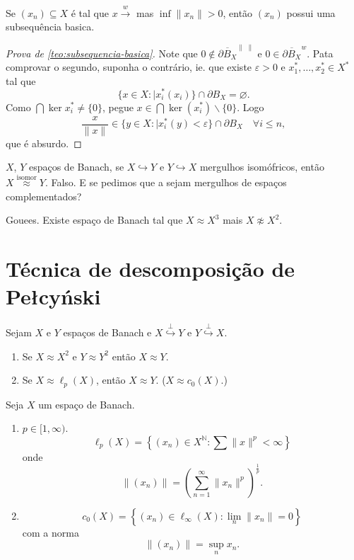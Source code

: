 \documentclass[portuguese]{article}
\theoremstyle{definition}
\newcommand{\N}{\mathbb{N}}
\begin{document}
\begin{coro}
	Se $(x_n)\subseteq X$ é tal que $x\overset{w}{\longrightarrow}$ mas $\inf\|x_n\|>0$, então $(x_n)$ possui uma subsequência basica.
\end{coro}
\begin{proof}[Prova de \cref{teo:subsequencia-basica}]
	Note que $0\notin \overline{\partial B_X}^{\|\;\|}$ e $0\in\overline{\partial B_X}^w$. Pata comprovar o segundo, suponha o contrário, ie. que existe $\varepsilon>0$ e $x_1^*,\ldots,x_2^*\in X^*$ tal que
	\[\{x\in X:|x^*_i(x_i)\}\cap\partial B_X=\varnothing.\]
	Como $\bigcap \ker x^*_i\neq\{0\}$, pegue $x\in \bigcap\ker(x_i^*)\backslash\{0\}$. Logo
	\[\frac{x}{\|x\|}\in\{y\in X:|x^*_i(y)<\varepsilon\}\cap\partial B_X\quad\forall i\leq n,\]
	que é absurdo.
\end{proof}
\begin{pregunta}
	$X$, $Y$ espaços de Banach, se $X\hookrightarrow Y$ e $Y\hookrightarrow X$ mergulhos isomófricos, então $X\overset{\text{isomor}}{\approx} Y$. Falso. E se pedimos que a sejam mergulhos de espaços complementados?
	
	Gouees. Existe espaço de Banach tal que $X\approx X^3$ mais $X\not\approx X^2$.
\end{pregunta}

\section{Técnica de descomposição de Pe\l cy\'nski}
\begin{teo}
	Sejam $X$ e $Y$ espaços de Banach e $X\overset{\perp}{\hookrightarrow}Y$ e $Y\overset{\perp}{\hookrightarrow}X$.
\begin{enumerate}
	\item Se $X\approx X^2$ e $Y\approx Y^2$ então $X\approx Y$.
	\item Se $X\approx\ell_p(X)$, então $X\approx Y$. ($X\approx c_0(X)$.)
\end{enumerate}
\end{teo}

\begin{defn}
	Seja $X$ um espaço de Banach.
	\begin{enumerate}
		\item $p\in[1,\infty)$.
		\[\ell_p(X)=\left\{(x_n)\in X^\N:\sum\|x\|^p<\infty\right\}\]
		onde
		\[\|(x_n)\|=\left(\sum_{n=1}^\infty\|x_n\|^p\right)^{\frac{1}{p}}.\]
		\item
		\[c_0(X)=\left\{(x_n)\in\ell_\infty(X):\lim_{n}\|x_n\|=0\right\}\]
		com a norma
		\[\|(x_n)\|=\sup_nx_n.\]
	\end{enumerate}
\end{defn}
\end{document}
